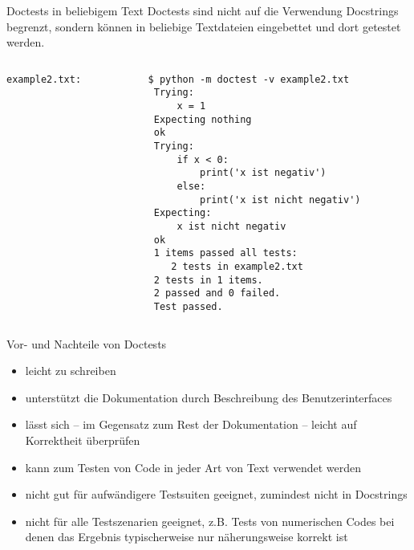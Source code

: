 \documentclass[t, utf8x, 10pt]{beamer}
\newcommand\pro{\textcolor{pro}{\faicon{smile-o}}}
\newcommand\contra{\textcolor{contra}{\faicon{frown-o}}}
\begin{document}
\begin{frame}[fragile]{Doctests in beliebigem Text}
 Doctests sind nicht auf die Verwendung Docstrings begrenzt, sondern können in
 beliebige Textdateien eingebettet und dort getestet werden.

 \begin{columns}
  \begin{column}{0.5\textwidth}
   \texttt{example2.txt:}
   \begin{footnotesize}
    
   \end{footnotesize}
  \end{column}
  \begin{column}{0.5\textwidth}
   \begin{footnotesize}
    \begin{lstlisting}[language={}]
 $ python -m doctest -v example2.txt
 Trying:
     x = 1
 Expecting nothing
 ok
 Trying:
     if x < 0:
         print('x ist negativ')
     else:
         print('x ist nicht negativ')
 Expecting:
     x ist nicht negativ
 ok
 1 items passed all tests:
    2 tests in example2.txt
 2 tests in 1 items.
 2 passed and 0 failed.
 Test passed.
    \end{lstlisting}
   \end{footnotesize}
  \end{column}
 \end{columns}
\end{frame}


\begin{frame}[c]{Vor- und Nachteile von Doctests}
 \begin{itemize}
  \item[\pro]    leicht zu schreiben
  \item[\pro]    unterstützt die Dokumentation durch Beschreibung des
	         Benutzerinterfaces
  \item[\pro]    lässt sich -- im Gegensatz zum Rest der Dokumentation -- leicht
	         auf Korrektheit überprüfen
  \item[\pro]    kann zum Testen von Code in jeder Art von Text verwendet
                 werden\\[0.5truecm]
  \item[\contra] nicht gut für aufwändigere Testsuiten geeignet, zumindest nicht
	         in Docstrings
  \item[\contra] nicht für alle Testszenarien geeignet, z.B. Tests
	         von numerischen Codes bei denen das Ergebnis typischerweise
		 nur näherungsweise korrekt ist
 \end{itemize}
\end{frame}
\end{document}
